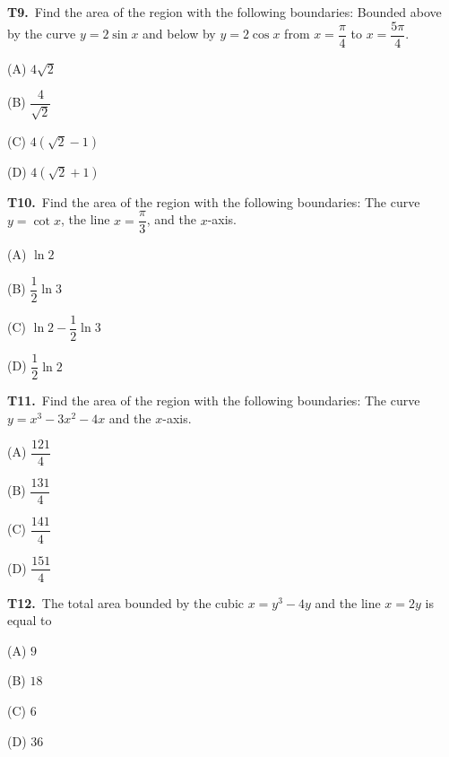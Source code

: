 \documentclass[11pt]{article}
\begin{document}
\bigskip\noindent\textbf{T9.}\ Find the area of the region with the following boundaries: Bounded above by the curve $y=2\sin x$ and below by $y=2\cos x$ from $x=\dfrac{\pi}{4}$ to $x=\dfrac{5\pi}{4}$.
\begin{list}{}{\setlength{\leftmargin}{3em}\setlength{\labelwidth}{2.5em}\setlength{\itemsep}{0pt}\setlength{\topsep}{2pt}}
\item[(A)] $4\sqrt{2}$
\item[(B)] $\dfrac{4}{\sqrt{2}}$
\item[(C)] $4(\sqrt{2}-1)$
\item[(D)] $4(\sqrt{2}+1)$
\end{list}

\bigskip\noindent\textbf{T10.}\ Find the area of the region with the following boundaries: The curve $y=\cot x$, the line $x=\dfrac{\pi}{3}$, and the $x$-axis.
\begin{list}{}{\setlength{\leftmargin}{3em}\setlength{\labelwidth}{2.5em}\setlength{\itemsep}{0pt}\setlength{\topsep}{2pt}}
\item[(A)] $\ln 2$
\item[(B)] $\dfrac{1}{2}\ln 3$
\item[(C)] $\ln 2-\dfrac{1}{2}\ln 3$
\item[(D)] $\dfrac{1}{2}\ln 2$
\end{list}

\bigskip\noindent\textbf{T11.}\ Find the area of the region with the following boundaries: The curve $y=x^3-3x^2-4x$ and the $x$-axis.
\begin{list}{}{\setlength{\leftmargin}{3em}\setlength{\labelwidth}{2.5em}\setlength{\itemsep}{0pt}\setlength{\topsep}{2pt}}
\item[(A)] $\dfrac{121}{4}$
\item[(B)] $\dfrac{131}{4}$
\item[(C)] $\dfrac{141}{4}$
\item[(D)] $\dfrac{151}{4}$
\end{list}

\bigskip\noindent\textbf{T12.}\ The total area bounded by the cubic $x=y^3-4y$ and the line $x=2y$ is equal to
\begin{list}{}{\setlength{\leftmargin}{3em}\setlength{\labelwidth}{2.5em}\setlength{\itemsep}{0pt}\setlength{\topsep}{2pt}}
\item[(A)] $9$
\item[(B)] $18$
\item[(C)] $6$
\item[(D)] $36$
\end{list}
\end{document}
